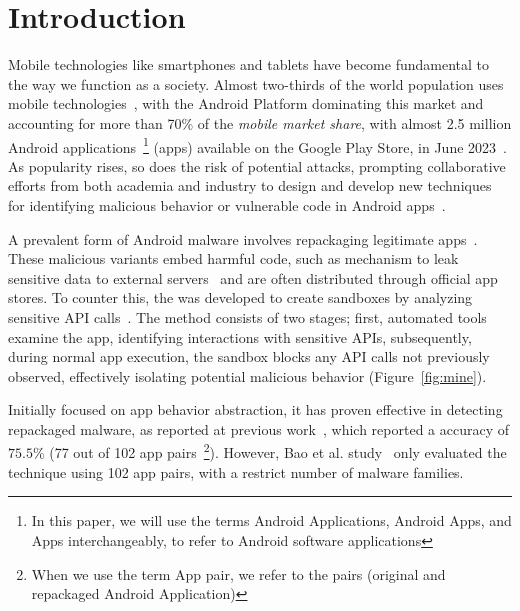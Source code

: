 \section{Introduction}\label{sec:introduction}

Mobile technologies like smartphones and tablets have become fundamental to the way we function as a society. Almost two-thirds of the world population uses mobile technologies~\cite{Comscore,DBLP:journals/tse/MartinSJZH17}, with the
Android Platform dominating this market and accounting for more than 70\% of the \emph{mobile market share}, with almost 2.5 million Android applications~\footnote{In this paper, we will use the terms Android Applications, Android Apps, and Apps interchangeably, to refer to Android software applications} (apps) available on the Google Play Store, in June 2023~\cite{Statista}.  
As popularity rises, so does the risk of potential attacks, prompting collaborative efforts from both academia and industry to design and develop new techniques for identifying malicious behavior or vulnerable code in Android apps~\cite{10.1145/3017427}.

A prevalent form of Android malware involves repackaging legitimate apps~\cite{DBLP:conf/wcre/BaoLL18, le2018towards}. These malicious variants embed harmful code, such as mechanism to leak sensitive data to external servers~\cite{DBLP:journals/tse/LiBK21} and are often distributed through official app stores. To counter this, the \mas was developed to create sandboxes by analyzing sensitive API calls~\cite{DBLP:conf/icse/JamrozikSZ16}. The method consists of two stages; first, automated tools examine the app, identifying interactions with sensitive APIs, subsequently, during normal app execution, the sandbox blocks any API calls not previously observed, effectively isolating potential malicious behavior (Figure~\ref{fig:mine}). 

Initially focused on app behavior abstraction, it has proven effective in detecting repackaged malware, as reported at previous work~\cite{DBLP:conf/wcre/BaoLL18}, which reported a accuracy of $75.5\%$ (77 out of 102 app pairs~\footnote{When we use the term App pair, we refer to the pairs (original and repackaged Android Application)}). However, Bao et al. study~\cite{DBLP:conf/wcre/BaoLL18} only evaluated the technique using 102 app pairs, with a restrict number of malware families. 


